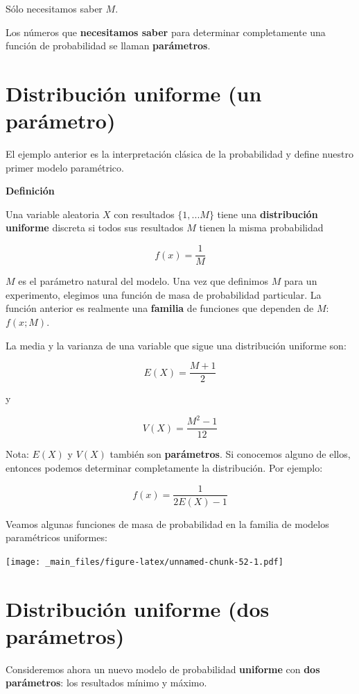 \documentclass[
]{book}
\begin{document}
Sólo necesitamos saber \(M\).

Los números que \textbf{necesitamos saber} para determinar completamente una función de probabilidad se llaman \textbf{parámetros}.

\hypertarget{distribuciuxf3n-uniforme-un-paruxe1metro}{%
\section{Distribución uniforme (un parámetro)}\label{distribuciuxf3n-uniforme-un-paruxe1metro}}

El ejemplo anterior es la interpretación clásica de la probabilidad y define nuestro primer modelo paramétrico.

\textbf{Definición}

Una variable aleatoria \(X\) con resultados \(\{1,...M\}\) tiene una \textbf{distribución uniforme} discreta si todos sus resultados \(M\) tienen la misma probabilidad

\[f(x)=\frac{1}{M}\]

\(M\) es el parámetro natural del modelo. Una vez que definimos \(M\) para un experimento, elegimos una función de masa de probabilidad particular. La función anterior es realmente una \textbf{familia} de funciones que dependen de \(M\): \(f(x; M)\).

La media y la varianza de una variable que sigue una distribución uniforme son:

\[E(X)= \frac{M+1}{2}\]

y

\[V(X)= \frac{M^2-1}{12}\]

Nota: \(E(X)\) y \(V(X)\) también son \textbf{parámetros}. Si conocemos alguno de ellos, entonces podemos determinar completamente la distribución. Por ejemplo:

\[f(x)=\frac{1}{2E(X)-1}\]

Veamos algunas funciones de masa de probabilidad en la familia de modelos paramétricos uniformes:

\texttt{[image: \_main\_files/figure-latex/unnamed-chunk-52-1.pdf]}

\hypertarget{distribuciuxf3n-uniforme-dos-paruxe1metros}{%
\section{Distribución uniforme (dos parámetros)}\label{distribuciuxf3n-uniforme-dos-paruxe1metros}}

Consideremos ahora un nuevo modelo de probabilidad \textbf{uniforme} con \textbf{dos parámetros}: los resultados mínimo y máximo.
\end{document}
